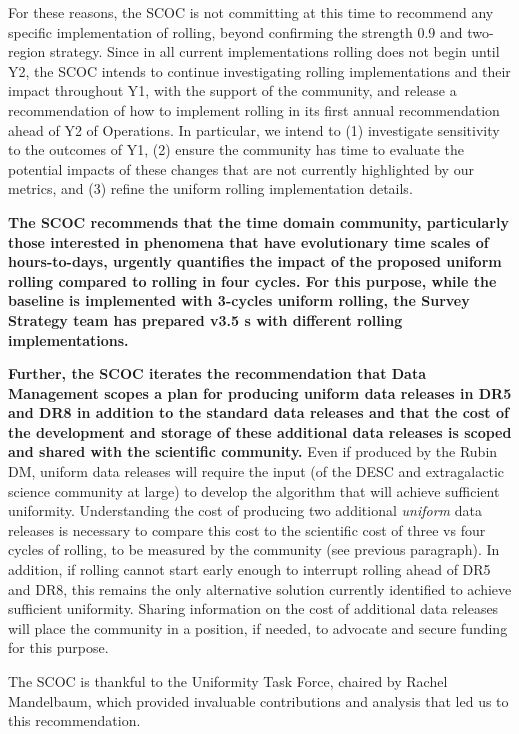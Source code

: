 For these reasons, the SCOC is not committing at this time to recommend any specific implementation of rolling, beyond confirming the strength 0.9 and two-region strategy. Since in all current implementations
rolling does not begin until Y2, the SCOC intends to continue investigating rolling implementations and their impact throughout Y1, with the support of the community, and release a recommendation of how to implement rolling in its first annual recommendation ahead of Y2 of Operations. In particular, we intend to (1) investigate sensitivity to the outcomes of Y1, (2) ensure the community has time to evaluate the potential impacts of these changes that are not currently highlighted by our metrics, and (3) refine the uniform rolling implementation details.

{\bf The SCOC recommends that the time domain community, particularly those interested in phenomena that have evolutionary time scales of hours-to-days, urgently quantifies the impact of the proposed uniform rolling compared to rolling in four cycles. For this purpose, while the baseline is implemented with 3-cycles uniform rolling, the Survey Strategy team has prepared v3.5 \opsim s  with different rolling implementations.}

{\bf Further, the SCOC iterates the recommendation that Data Management scopes a plan for producing uniform data releases in DR5 and DR8 in addition to the standard data releases and that the cost of the development and storage of these additional data releases is scoped and shared with the scientific community.} Even if produced by the Rubin DM, uniform data releases will require the input (of the DESC and extragalactic science community at large) to develop the algorithm that will achieve sufficient uniformity. Understanding the cost of producing two additional {\it uniform} data releases is necessary to compare this cost to the scientific cost of three vs four cycles of rolling, to be measured by the community (see previous paragraph). In addition, if rolling cannot start early enough to interrupt rolling ahead of DR5 and DR8, this remains the only alternative solution currently identified to achieve sufficient uniformity. Sharing information on the cost of additional data releases will place the community in a position, if needed, to advocate and secure funding for this purpose.

The SCOC is thankful to the Uniformity Task Force, chaired by Rachel Mandelbaum, which provided invaluable contributions and analysis that led us to this recommendation.

